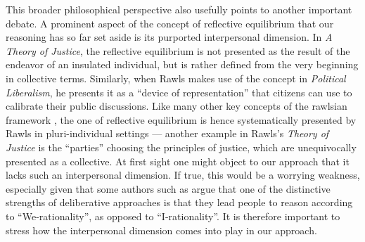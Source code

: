 \documentclass[version=3.21, pagesize, twoside=off, bibliography=totoc, DIV=calc, fontsize=12pt, a4paper, french, english]{scrartcl}
\begin{document}
This broader philosophical perspective also usefully points to another important debate. 
A prominent aspect of the concept of reflective equilibrium that our reasoning has so far set aside is its purported interpersonal dimension. 
In \emph{A Theory of Justice}, the reflective equilibrium is not presented as the result of the endeavor of an insulated individual, but is rather defined from the very beginning in collective terms. 
Similarly, when Rawls makes use of the concept in \emph{Political Liberalism}, he presents it as a  “device of representation” that citizens can use to calibrate their public discussions. 
Like many other key concepts of the rawlsian framework , the one of reflective equilibrium is hence systematically presented by Rawls in pluri-individual settings --- another example in Rawls’s \emph{Theory of Justice} is the “parties” choosing the principles of justice, which are unequivocally presented as a collective. 
At first sight one might object to our approach that it lacks such an interpersonal dimension.
If true, this would be a worrying weakness, especially given that some authors such as \citet{vatn_institutional_2009} argue that one of the distinctive strengths of deliberative approaches is that they lead people to reason according to ``We-rationality'', as opposed to ``I-rationality''. 
It is therefore important to stress how the interpersonal dimension comes into play in our approach.
\end{document}
